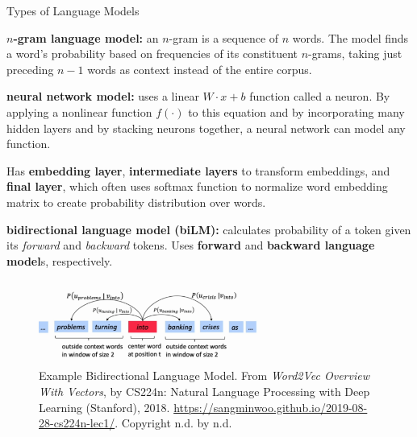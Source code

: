 \begin{frame}{Types of Language Models}
    

\begin{itemizeSpaced}{5pt}
    \item \textbf{$n$-gram language model: } an $n$-gram is a sequence of $n$ words. The model finds a word's probability based on frequencies of its constituent $n$-grams, taking just preceding $n-1$ words as context instead of the entire corpus. 
    
    \item \textbf{neural network model: } uses a linear $W \cdot x + b$ function called a neuron. By applying a nonlinear function $f(\cdot)$ to this equation and by incorporating many hidden layers and by stacking neurons together, a neural network can model any function.
    
    Has \textbf{embedding layer}, \textbf{intermediate layers} to transform embeddings, and \textbf{final layer}, which often uses softmax function to normalize word embedding matrix to create probability distribution over words. 
    
    \item \textbf{bidirectional language model (biLM): } calculates probability of a token given its \emph{forward} and \emph{backward} tokens. Uses \textbf{forward} and \textbf{backward language model}s, respectively. 
    
    
    

    \begin{figure}[h]
    \vspace{-5pt}
    \centering
    \includegraphics[width=0.65\textwidth]{imgs/bidirectional_languagemodel_banking.png}
    \vspace{-10pt}
    \caption{\tiny Example Bidirectional Language Model. From \emph{Word2Vec Overview With Vectors}, by CS224n: Natural Language Processing with Deep Learning (Stanford), 2018. \url{https://sangminwoo.github.io/2019-08-28-cs224n-lec1/}. Copyright n.d. by n.d.}
    \vspace{-5pt}
    \label{fig:bidirectionalLM}
    \end{figure}
    
\end{itemizeSpaced}

\end{frame}





